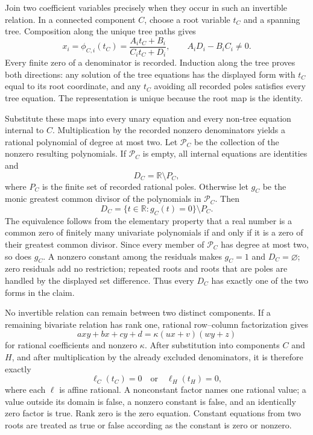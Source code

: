 Join two coefficient variables precisely when they occur in such an invertible relation.  In a connected component \(C\), choose a root variable \(t_C\) and a spanning tree.  Composition along the unique tree paths gives
\[
x_i=\phi_{C,i}(t_C)=\frac{A_i t_C+B_i}{C_i t_C+D_i},
\qquad A_iD_i-B_iC_i\ne0.
\]
Every finite zero of a denominator is recorded.  Induction along the tree proves both directions: any solution of the tree equations has the displayed form with \(t_C\) equal to its root coordinate, and any \(t_C\) avoiding all recorded poles satisfies every tree equation.  The representation is unique because the root map is the identity.

Substitute these maps into every unary equation and every non-tree equation internal to \(C\).  Multiplication by the recorded nonzero denominators yields a rational polynomial of degree at most two.  Let \(\mathcal P_C\) be the collection of the nonzero resulting polynomials.  If \(\mathcal P_C\) is empty, all internal equations are identities and
\[
D_C=\mathbb R\setminus P_C,
\]
where \(P_C\) is the finite set of recorded rational poles.  Otherwise let \(g_C\) be the monic greatest common divisor of the polynomials in \(\mathcal P_C\).  Then
\[
D_C=\{t\in\mathbb R:g_C(t)=0\}\setminus P_C.
\]
The equivalence follows from the elementary property that a real number is a common zero of finitely many univariate polynomials if and only if it is a zero of their greatest common divisor.  Since every member of \(\mathcal P_C\) has degree at most two, so does \(g_C\).  A nonzero constant among the residuals makes \(g_C=1\) and \(D_C=\varnothing\); zero residuals add no restriction; repeated roots and roots that are poles are handled by the displayed set difference.  Thus every \(D_C\) has exactly one of the two forms in the claim.

No invertible relation can remain between two distinct components.  If a remaining bivariate relation has rank one, rational row--column factorization gives
\[
axy+bx+cy+d=\kappa(ux+v)(wy+z)
\]
for rational coefficients and nonzero \(\kappa\).  After substitution into components \(C\) and \(H\), and after multiplication by the already excluded denominators, it is therefore exactly
\[
\ell_C(t_C)=0\quad\text{or}\quad \ell_H(t_H)=0,
\]
where each \(\ell\) is affine rational.  A nonconstant factor names one rational value; a value outside its domain is false, a nonzero constant is false, and an identically zero factor is true.  Rank zero is the zero equation.  Constant equations from two roots are treated as true or false according as the constant is zero or nonzero.

